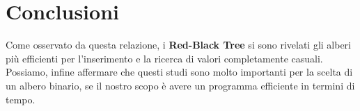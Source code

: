 \documentclass[a4paper,titlepage]{article}
\begin{document}
\section{Conclusioni}

Come osservato da questa relazione, i \textbf{Red-Black Tree} si sono rivelati gli alberi più efficienti per l’inserimento e la ricerca di valori completamente casuali. Possiamo, infine affermare che questi studi sono molto importanti per la scelta di un albero binario, se il nostro scopo è avere un programma efficiente in termini di tempo.
\end{document}
